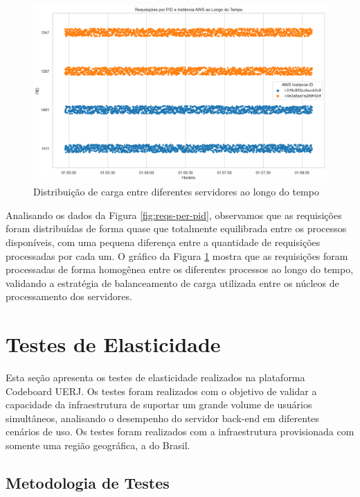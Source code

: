 \begin{figure}[H]
    \centering
    \includegraphics[width=1\textwidth]{assets/balance-test/reqs-per-pid-over-time.png}
    \caption{Distribuição de carga entre diferentes servidores ao longo do tempo}
    \label{fig:reqs-per-pid-over-time}
\end{figure}

Analisando os dados da Figura \ref{fig:reqs-per-pid}, observamos que as requisições foram distribuídas de forma quase que totalmente equilibrada entre os processos disponíveis, com uma pequena diferença entre a quantidade de requisições processadas por cada um. O gráfico da Figura \ref{fig:reqs-per-pid-over-time} mostra que as requisições foram processadas de forma homogênea entre os diferentes processos ao longo do tempo, validando a estratégia de balanceamento de carga utilizada entre os núcleos de processamento dos servidores.



\section{Testes de Elasticidade}

Esta seção apresenta os testes de elasticidade realizados na plataforma Codeboard UERJ. Os testes foram realizados com o objetivo de validar a capacidade da infraestrutura de suportar um grande volume de usuários simultâneos, analisando o desempenho do servidor back-end em diferentes cenários de uso. Os testes foram realizados com a infraestrutura provisionada com somente uma região geográfica, a do Brasil.


\subsection{Metodologia de Testes}

